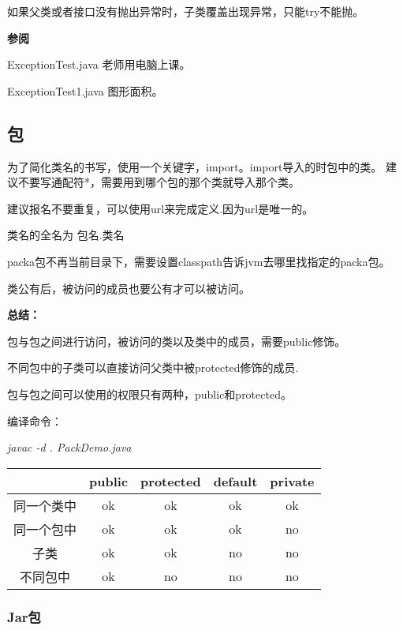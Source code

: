 \documentclass[UTF8]{ctexart}
\begin{document}
\textbullet 如果父类或者接口没有抛出异常时，子类覆盖出现异常，只能try不能抛。

\textbf{参阅}

\textbullet ExceptionTest.java 老师用电脑上课。

\textbullet ExceptionTest1.java 图形面积。

\subsection{包}

为了简化类名的书写，使用一个关键字，import。import导入的时包中的类。
建议不要写通配符*，需要用到哪个包的那个类就导入那个类。

建议报名不要重复，可以使用url来完成定义.因为url是唯一的。

类名的全名为 包名.类名

packa包不再当前目录下，需要设置classpath告诉jvm去哪里找指定的packa包。

类公有后，被访问的成员也要公有才可以被访问。

\textbf{总结：}

\textbullet 包与包之间进行访问，被访问的类以及类中的成员，需要public修饰。

\textbullet 不同包中的子类可以直接访问父类中被protected修饰的成员.

\textbullet 包与包之间可以使用的权限只有两种，public和protected。

编译命令：

\textit{javac -d . PackDemo.java}

\begin{tabular}{c|cccc}
           &public &protected &default &private \\ \hline
同一个类中 &ok     &ok        &ok      &ok \\
同一个包中 &ok     &ok        &ok      &no \\
子类       &ok     &ok        &no      &no \\
不同包中   &ok     &no        &no      &no \\
\end{tabular}







\subsubsection{Jar包}
\end{document}
